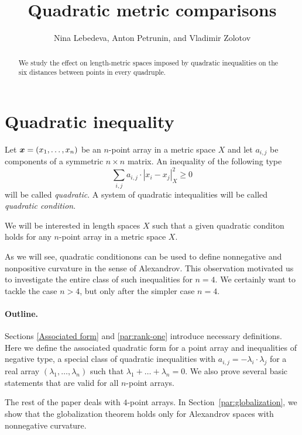 \documentclass[a4paper,10pt]{article}
\def\thetitle{Quadratic metric comparisons}
\def\theauthors{Nina Lebedeva, Anton Petrunin, and Vladimir Zolotov}
\begin{document}

\title{\thetitle}
\author{\theauthors}
\date{}
\maketitle

\begin{abstract}
We study the effect on length-metric spaces imposed by quadratic inequalities on the six distances between points in every quadruple.
\end{abstract}

\section{Quadratic inequality}\label{par:quadratic-inq}

Let $\bm{x}\z=(x_1,\dots,x_n)$ be an $n$-point array in a metric space $X$ and let $a_{i,j}$ be components of a symmetric $n{\times}n$ matrix.
An inequality of the following type
\[\sum_{i,j}a_{i,j}\cdot|x_i-x_j|_X^2\ge 0\]
will be called \emph{quadratic}.
A system of quadratic intequalities will be called \emph{quadratic condition}.

We will be interested in length spaces $X$ such that a given quadratic conditon holds for any $n$-point array in a metric space $X$.

As we will see, quadratic conditionons can be used to define  nonnegative and nonpositive curvature in the sense of Alexandrov.
This observation motivated us to investigate the entire class of such inequalities for $n=4$.
We certainly want to tackle the case $n>4$, but only after the simpler case $n=4$.

\paragraph{Outline.}
Sections \ref{Associated form} and \ref{par:rank-one} introduce necessary definitions.
Here we define
the
associated quadratic form for a point array and inequalities of negative type, a special class of quadratic inequalities with $a_{i,j}=-\lambda_i\cdot\lambda_j$ for a real array $(\lambda_1,\dots, \lambda_n)$ such that $\lambda_1+\dots+\lambda_n=0$.
We also prove several basic statements that are valid for all $n$-point arrays.

The rest of the paper deals with $4$-point arrays.
In Section~\ref{par:globalization}, we show that the globalization theorem holds only for Alexandrov spaces with nonnegative curvature.
\end{document}
